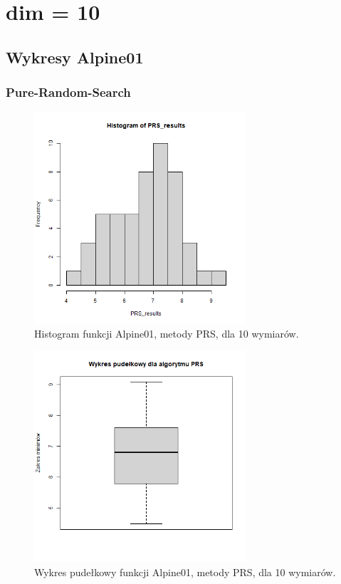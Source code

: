 \documentclass{lab}
\begin{document}
\section{dim = 10}
\subsection{Wykresy Alpine01}
\subsubsection{Pure-Random-Search}
\begin{figure}[H]
  \centering
  \includegraphics[width=0.7\textwidth]{img/dim10_PRS_Alpine01_his.png}
  \caption{Histogram funkcji Alpine01, metody PRS, dla 10 wymiarów.}
\end{figure}
\begin{figure}[H]
  \centering
  \includegraphics[width=0.7\textwidth]{img/dim10_PRS_Alpine01.png}
  \caption{Wykres pudełkowy funkcji Alpine01, metody PRS, dla 10 wymiarów.}
\end{figure}
\end{document}

